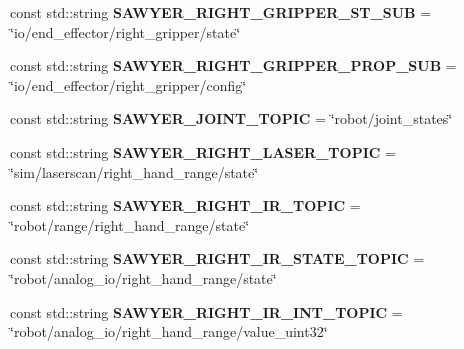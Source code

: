 \begin{DoxyCompactItemize}
\item 
\hypertarget{namespacesawyer__en_ac7f55184e3b87d9ced70994aa489714e}{const std\-::string {\bfseries S\-A\-W\-Y\-E\-R\-\_\-\-R\-I\-G\-H\-T\-\_\-\-G\-R\-I\-P\-P\-E\-R\-\_\-\-S\-T\-\_\-\-S\-U\-B} = \char`\"{}io/end\-\_\-effector/right\-\_\-gripper/state\char`\"{}}\label{namespacesawyer__en_ac7f55184e3b87d9ced70994aa489714e}

\item 
\hypertarget{namespacesawyer__en_aa72631a90f0a4b7403745784f01e86a5}{const std\-::string {\bfseries S\-A\-W\-Y\-E\-R\-\_\-\-R\-I\-G\-H\-T\-\_\-\-G\-R\-I\-P\-P\-E\-R\-\_\-\-P\-R\-O\-P\-\_\-\-S\-U\-B} = \char`\"{}io/end\-\_\-effector/right\-\_\-gripper/config\char`\"{}}\label{namespacesawyer__en_aa72631a90f0a4b7403745784f01e86a5}

\item 
\hypertarget{namespacesawyer__en_ae5a71691e7a42e6bc91901570b750ef1}{const std\-::string {\bfseries S\-A\-W\-Y\-E\-R\-\_\-\-J\-O\-I\-N\-T\-\_\-\-T\-O\-P\-I\-C} = \char`\"{}robot/joint\-\_\-states\char`\"{}}\label{namespacesawyer__en_ae5a71691e7a42e6bc91901570b750ef1}

\item 
\hypertarget{namespacesawyer__en_a7f6da3b2d8fd900be4033ddc0a9b80b1}{const std\-::string {\bfseries S\-A\-W\-Y\-E\-R\-\_\-\-R\-I\-G\-H\-T\-\_\-\-L\-A\-S\-E\-R\-\_\-\-T\-O\-P\-I\-C} = \char`\"{}sim/laserscan/right\-\_\-hand\-\_\-range/state\char`\"{}}\label{namespacesawyer__en_a7f6da3b2d8fd900be4033ddc0a9b80b1}

\item 
\hypertarget{namespacesawyer__en_a0f4fd7054e0e87066dca7c17e13b89b3}{const std\-::string {\bfseries S\-A\-W\-Y\-E\-R\-\_\-\-R\-I\-G\-H\-T\-\_\-\-I\-R\-\_\-\-T\-O\-P\-I\-C} = \char`\"{}robot/range/right\-\_\-hand\-\_\-range/state\char`\"{}}\label{namespacesawyer__en_a0f4fd7054e0e87066dca7c17e13b89b3}

\item 
\hypertarget{namespacesawyer__en_ab3d4af4fa0a3d95af08dd9f854c1e502}{const std\-::string {\bfseries S\-A\-W\-Y\-E\-R\-\_\-\-R\-I\-G\-H\-T\-\_\-\-I\-R\-\_\-\-S\-T\-A\-T\-E\-\_\-\-T\-O\-P\-I\-C} = \char`\"{}robot/analog\-\_\-io/right\-\_\-hand\-\_\-range/state\char`\"{}}\label{namespacesawyer__en_ab3d4af4fa0a3d95af08dd9f854c1e502}

\item 
\hypertarget{namespacesawyer__en_a210d83ea3b63b45d03108c1fa039dda8}{const std\-::string {\bfseries S\-A\-W\-Y\-E\-R\-\_\-\-R\-I\-G\-H\-T\-\_\-\-I\-R\-\_\-\-I\-N\-T\-\_\-\-T\-O\-P\-I\-C} = \char`\"{}robot/analog\-\_\-io/right\-\_\-hand\-\_\-range/value\-\_\-uint32\char`\"{}}\label{namespacesawyer__en_a210d83ea3b63b45d03108c1fa039dda8}


\end{DoxyCompactItemize}
